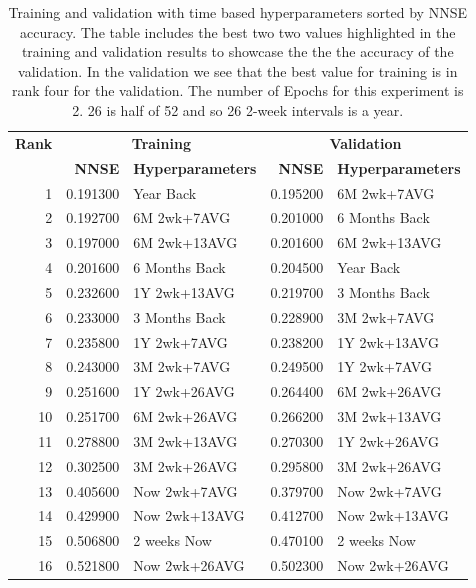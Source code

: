 \documentclass[utf8]{FrontiersinVancouver} %
\begin{document}
\begin{table}[htb]

  \caption{Training and validation with time based hyperparameters
    sorted by NNSE accuracy. The table includes the best two two
    values highlighted in the training and validation results to
    showcase the the the accuracy of the validation. In the validation
    we see that the best value for training is in rank four for the
    validation. The number of Epochs for this experiment is 2.
    26 is half of 52 and so 26 2-week intervals is a year.}
  \label{tab:training-2}

  \renewcommand{\arraystretch}{1.2}
\begin{center}
\begin{tabular}{|r|rl||rl|}
  \hline
{\bf Rank} & \multicolumn{2}{c||}{\bfseries Training} & \multicolumn{2}{c|}{\bfseries Validation} \\
     &   {\bf NNSE} & {\bf Hyperparameters} & {\bf NNSE} & {\bf Hyperparameters} \\
              \hline
1 & \color{red} 0.191300 & \color{red} Year Back & \color{blue} 0.195200 & \color{blue} 6M 2wk+7AVG} \\
2 & 0.192700 & \color{blue} 6M 2wk+7AVG & \color{teal} 0.201000 & \color{teal} 6 Months Back \\
3 & 0.197000 & 6M 2wk+13AVG & 0.201600 & 6M 2wk+13AVG \\
4 & \color{teal} 0.201600 & \color{teal} 6 Months Back & \color{red} 0.204500 & \color{red} Year Back \\
5 & 0.232600 & 1Y 2wk+13AVG & 0.219700 & 3 Months Back \\
6 & 0.233000 & 3 Months Back & 0.228900 & 3M 2wk+7AVG \\
7 & 0.235800 & 1Y 2wk+7AVG & 0.238200 & 1Y 2wk+13AVG \\
8 & 0.243000 & 3M 2wk+7AVG & 0.249500 & 1Y 2wk+7AVG \\
9 & 0.251600 & 1Y 2wk+26AVG & 0.264400 & 6M 2wk+26AVG \\
10 & 0.251700 & 6M 2wk+26AVG & 0.266200 & 3M 2wk+13AVG \\
11 & 0.278800 & 3M 2wk+13AVG & 0.270300 & 1Y 2wk+26AVG \\
12 & 0.302500 & 3M 2wk+26AVG & 0.295800 & 3M 2wk+26AVG \\
13 & 0.405600 & Now 2wk+7AVG & 0.379700 & Now 2wk+7AVG \\
14 & 0.429900 & Now 2wk+13AVG & 0.412700 & Now 2wk+13AVG \\
15 & 0.506800 & 2 weeks Now & 0.470100 & 2 weeks Now \\
16 & 0.521800 & Now 2wk+26AVG & 0.502300 & Now 2wk+26AVG \\
\hline
\end{tabular}
\end{center}

\end{table}
\end{document}
